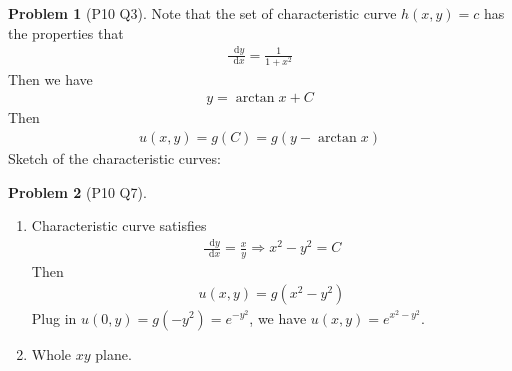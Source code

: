\documentclass[twoside,11pt]{article}
\renewcommand*\d{\mathop{}\!\mathrm{d}}
\theoremstyle{definition}
\newtheorem{problem}{Problem}
\theoremstyle{remark}
\begin{document}
\begin{problem}[P10 Q3]
Note that the set of characteristic curve $h(x, y)=c$
has the properties that 
\begin{align*}
    \frac{\d y}{\d x} = \frac{1}{1+x^2}
\end{align*}
Then we have
\begin{align*}
    y = \arctan x + C
\end{align*}
Then 
\begin{align*}
    u(x,y) = g(C) = g(y-\arctan x)
\end{align*}
Sketch of the characteristic curves:
\begin{figure}[H]
    \centering
\end{figure}
\end{problem}

\begin{problem}[P10 Q7]\
\begin{enumerate}[label=(\alph*)]
    \item Characteristic curve satisfies
    \begin{align*}
        \frac{\d y}{\d x} = \frac{x}{y}\Rightarrow x^2 - y^2 = C
    \end{align*}
    Then
    \begin{align*}
        u(x,y) = g(x^2 - y^2)
    \end{align*}
    Plug in $u(0, y) = g(-y^2) = e^{-y^2}$, we have $u(x,y) = e^{x^2 - y^2}$.

    \item Whole $xy$ plane.
\end{enumerate}
\end{problem}
\end{document}

